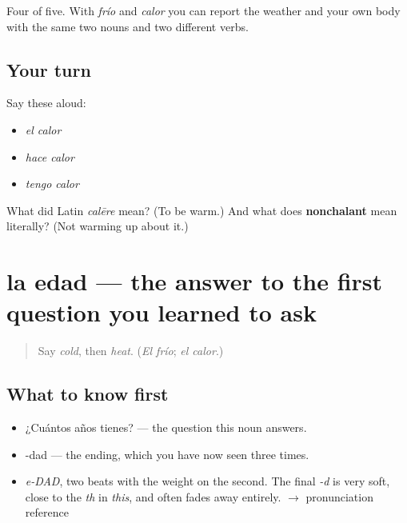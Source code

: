 \begin{grammarlens}[title={What you've built}]
Four of five. With \emph{frío} and \emph{calor} you can report the weather and your own body with the same two nouns and two different verbs.
\end{grammarlens}

\subsection*{Your turn}
Say these aloud:

\begin{itemize}
\raggedright
  \item \emph{el calor}
  \item \emph{hace calor}
  \item \emph{tengo calor}
\end{itemize}

\begin{tcolorbox}[breakable,colback=teal!4,colframe=teal!35!black,title={Before you move on}]
What did Latin \emph{calēre} mean? (To be warm.) And what does \textbf{nonchalant} mean literally? (Not warming up about it.)
\end{tcolorbox}
\section[la edad]{la edad — the answer to the first question you learned to ask}

\label{lesson:ES-C334-edad}



\begin{quote}
Say \emph{cold}, then \emph{heat}. (\emph{El frío}; \emph{el calor}.)
\end{quote}

\subsection*{What to know first}
\begin{itemize}
\raggedright
  \item ¿Cuántos años tienes? — the question this noun answers.
  \item -dad — the ending, which you have now seen three times.
\end{itemize}

\begin{sounds}
\begin{itemize}
\raggedright
  \item \emph{e-DAD}, two beats with the weight on the second. The final \emph{-d} is very soft, close to the \emph{th} in \emph{this}, and often fades away entirely. $\to$ pronunciation reference
\end{itemize}
\end{sounds}

